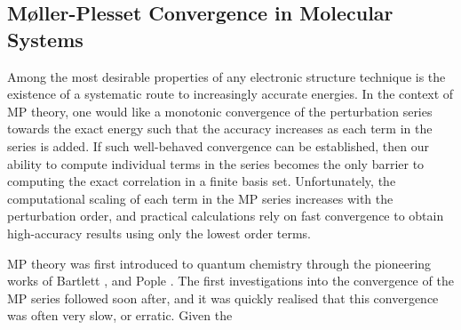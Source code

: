 \documentclass[aps,prb,reprint,noshowkeys,linenumbers,superscriptaddress]{revtex4-1}
\newcommand{\hugh}[1]{\textcolor{hughgreen}{#1}}
\begin{document}
\subsection{M{\o}ller-Plesset Convergence in Molecular Systems}

\hugh{Among the most desirable properties of any electronic structure technique is the existence of 
a systematic route to increasingly accurate energies. 
In the context of MP theory, one would like a monotonic convergence of the perturbation
series towards the exact energy such that the accuracy increases as each term in the series is added.
If such well-behaved convergence can be established, then our ability to compute individual 
terms in the series becomes the only barrier to computing the exact correlation in a finite basis set.
Unfortunately, the computational scaling of each term in the MP series increases with the perturbation
order, and practical calculations rely on fast convergence
to obtain high-accuracy results using only the lowest order terms.
}

\hugh{MP theory was first introduced to quantum chemistry through the pioneering
works of Bartlett \etal{},\cite{Bartlett_1975} and Pople \etal{}.\cite{Pople_1976,Pople_1978}
The first investigations into the convergence of the MP series followed soon after, and 
it was quickly realised that this convergence was often very slow, or erratic. 
}
Given the





\end{document}
